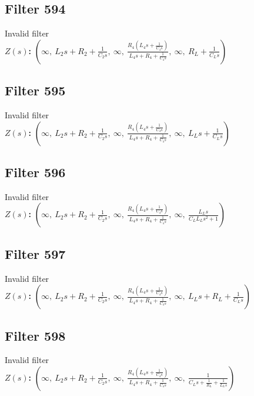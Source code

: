 \documentclass{article}
\begin{document}
\subsection*{Filter 594}
Invalid filter \\ 
\textbf{$Z(s)$:} $\left( \infty, \  L_{2} s + R_{2} + \frac{1}{C_{2} s}, \  \infty, \  \frac{R_{4} \left(L_{4} s + \frac{1}{C_{4} s}\right)}{L_{4} s + R_{4} + \frac{1}{C_{4} s}}, \  \infty, \  R_{L} + \frac{1}{C_{L} s}\right)$ \\ 
\subsection*{Filter 595}
Invalid filter \\ 
\textbf{$Z(s)$:} $\left( \infty, \  L_{2} s + R_{2} + \frac{1}{C_{2} s}, \  \infty, \  \frac{R_{4} \left(L_{4} s + \frac{1}{C_{4} s}\right)}{L_{4} s + R_{4} + \frac{1}{C_{4} s}}, \  \infty, \  L_{L} s + \frac{1}{C_{L} s}\right)$ \\ 
\subsection*{Filter 596}
Invalid filter \\ 
\textbf{$Z(s)$:} $\left( \infty, \  L_{2} s + R_{2} + \frac{1}{C_{2} s}, \  \infty, \  \frac{R_{4} \left(L_{4} s + \frac{1}{C_{4} s}\right)}{L_{4} s + R_{4} + \frac{1}{C_{4} s}}, \  \infty, \  \frac{L_{L} s}{C_{L} L_{L} s^{2} + 1}\right)$ \\ 
\subsection*{Filter 597}
Invalid filter \\ 
\textbf{$Z(s)$:} $\left( \infty, \  L_{2} s + R_{2} + \frac{1}{C_{2} s}, \  \infty, \  \frac{R_{4} \left(L_{4} s + \frac{1}{C_{4} s}\right)}{L_{4} s + R_{4} + \frac{1}{C_{4} s}}, \  \infty, \  L_{L} s + R_{L} + \frac{1}{C_{L} s}\right)$ \\ 
\subsection*{Filter 598}
Invalid filter \\ 
\textbf{$Z(s)$:} $\left( \infty, \  L_{2} s + R_{2} + \frac{1}{C_{2} s}, \  \infty, \  \frac{R_{4} \left(L_{4} s + \frac{1}{C_{4} s}\right)}{L_{4} s + R_{4} + \frac{1}{C_{4} s}}, \  \infty, \  \frac{1}{C_{L} s + \frac{1}{R_{L}} + \frac{1}{L_{L} s}}\right)$ \\ 
\end{document}
